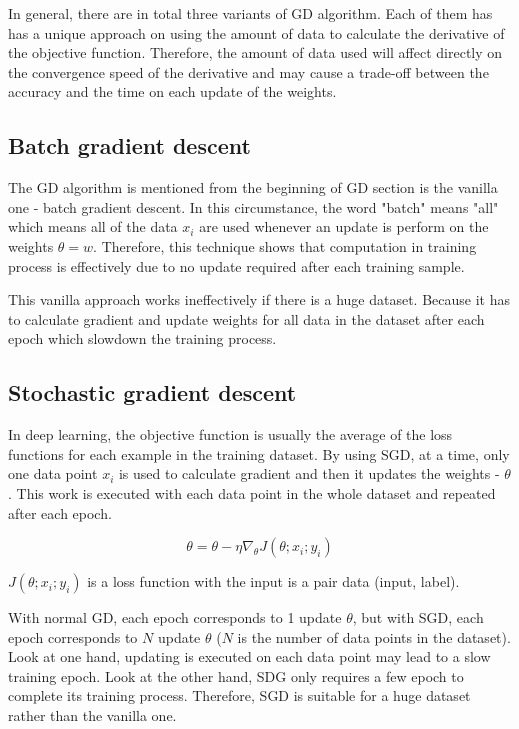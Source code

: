 	In general, there are in total three variants of GD algorithm. Each of them has has a unique approach on using the amount of data to calculate the derivative of the objective function. Therefore, the amount of data used will affect directly on the convergence speed of the derivative and may cause a trade-off between the accuracy and the time on each update of the weights.
	
	
	\subsection{Batch gradient descent}
	\label{subsection:batchGD}
	\noindent

	The GD algorithm is mentioned from the beginning of GD section is the vanilla one - batch gradient descent. In this circumstance, the word "batch" means "all" which means all of the data $x_i$ are used whenever an update is perform on the weights $\theta = w$. Therefore, this technique shows that computation in training process is effectively due to no update required after each training sample.
	
	This vanilla approach works ineffectively if there is a huge dataset. Because it has to calculate gradient and update weights for all data in the dataset after each epoch which slowdown the training process.
	
	\subsection{Stochastic gradient descent}
	\label{subsection:SGD}
	\noindent

	In deep learning, the objective function is usually the average of the loss functions for each example in the training dataset. By using SGD, at a time, only one data point $x_i$ is used to calculate gradient and then it updates the weights -  $\theta$. This work is executed with each data point in the whole dataset and repeated after each epoch. 
	
	\[\theta = \theta - \eta \nabla_{\theta} J(\theta; x_i; y_i)\]
	
	\noindent
	$ J(\theta; x_i; y_i)$ is a loss function with the input is a pair data (input, label).
	
	With normal GD, each epoch corresponds to 1 update $\theta$, but with SGD, each epoch corresponds to $N$ update $\theta$ ($N$ is the number of data points in the dataset). Look at one hand, updating is executed on each data point may lead to a slow training epoch. Look at the other hand, SDG only requires a few epoch to complete its training process. Therefore, SGD is suitable for a huge dataset rather than the vanilla one.
	
